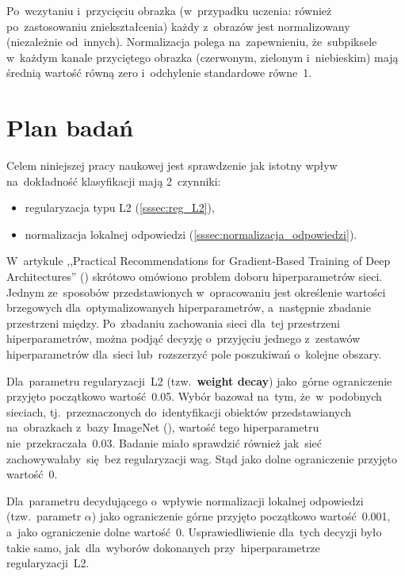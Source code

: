 Po~wczytaniu i~przycięciu obrazka (w~przypadku uczenia: również po~zastosowaniu zniekształcenia) każdy z~obrazów jest
normalizowany (niezależnie od~innych). Normalizacja polega na~zapewnieniu, że~subpiksele w~każdym kanale
przyciętego obrazka (czerwonym, zielonym i~niebieskim) mają średnią wartość równą zero i~odchylenie standardowe równe~1.



\section{Plan badań}
Celem niniejszej pracy naukowej jest sprawdzenie jak istotny wpływ na~dokładność klasyfikacji mają 2~czynniki:
\begin{itemize}
    \item regularyzacja typu L2 (\ref{sssec:reg_L2}),
    \item normalizacja lokalnej odpowiedzi (\ref{sssec:normalizacja_odpowiedzi}).
\end{itemize}

W~artykule ,,Practical Recommendations for Gradient-Based Training of Deep Architectures''
(\cite{practical-gradient-based}) skrótowo omówiono problem doboru hiperparametrów sieci. Jednym ze~sposobów
przedstawionych w~opracowaniu jest określenie wartości brzegowych dla~optymalizowanych hiperparametrów,
a~następnie zbadanie przestrzeni między. Po~zbadaniu zachowania sieci dla~tej przestrzeni hiperparametrów, można podjąć
decyzję o~przyjęciu jednego z~zestawów hiperparametrów dla~sieci lub~rozszerzyć pole poszukiwań o~kolejne obszary.

Dla~parametru regularyzacji~L2 (tzw.~\textbf{weight decay}) jako~górne ograniczenie przyjęto początkowo wartość~0.05.
Wybór bazował na~tym, że~w~podobnych sieciach, tj.~przeznaczonych do~identyfikacji obiektów przedstawianych na~obrazkach
z~bazy ImageNet (\cite{imagenet}), wartość tego hiperparametru nie~przekraczała~0.03. Badanie miało sprawdzić
również jak~sieć zachowywałaby~się~bez regularyzacji wag. Stąd jako dolne ograniczenie przyjęto wartość~0.

Dla~parametru decydującego o~wpływie normalizacji lokalnej odpowiedzi (tzw.~parametr $\alpha$) jako ograniczenie górne
przyjęto początkowo wartość~0.001, a~jako ograniczenie dolne wartość~0. Usprawiedliwienie dla~tych decyzji było
takie samo, jak~dla~wyborów dokonanych przy~hiperparametrze regularyzacji~L2.

